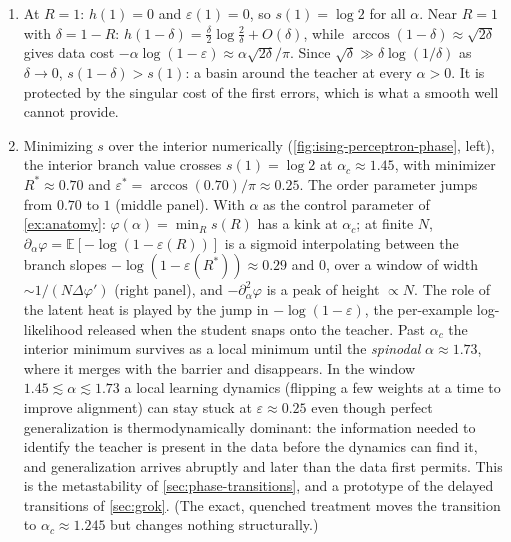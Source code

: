\documentclass[11pt]{article}
\newcommand{\E}{\mathbb{E}}
\newcommand{\pd}{\partial}
\begin{document}
\begin{solution}[ex:ising]
\begin{enumerate}
\begin{figure}[H]
      \caption{The annealed action $s(R)$ of the Ising perceptron, \eqref{perc-action}, for several loads. Interior local minima are marked with circles; the teacher state $R=1$, where $s(1) = \log2$ exactly, with squares. The two basins exchange dominance near $\alpha\approx1.45$.}
      \label{fig:ising-perceptron-action}
    \end{figure}
    \item At $R=1$: $h(1) = 0$ and $\varepsilon(1) = 0$, so $s(1) = \log2$ for all $\alpha$. Near $R=1$ with $\delta = 1-R$: $h(1-\delta) = \frac{\delta}{2}\log\frac{2}{\delta}+O(\delta)$, while $\arccos(1-\delta)\approx\sqrt{2\delta}$ gives data cost $-\alpha\log(1-\varepsilon)\approx\alpha\sqrt{2\delta}/\pi$. Since $\sqrt\delta\gg\delta\log(1/\delta)$ as $\delta\to0$, $s(1-\delta)>s(1)$: a basin around the teacher at every $\alpha>0$. It is protected by the singular cost of the first errors, which is what a smooth well cannot provide.
    \item Minimizing $s$ over the interior numerically (\cref{fig:ising-perceptron-phase}, left), the interior branch value crosses $s(1) = \log2$ at $\alpha_c\approx1.45$, with minimizer $R^*\approx0.70$ and $\varepsilon^* = \arccos(0.70)/\pi\approx0.25$. The order parameter jumps from $0.70$ to $1$ (middle panel). With $\alpha$ as the control parameter of \cref{ex:anatomy}: $\varphi(\alpha) = \min_Rs(R)$ has a kink at $\alpha_c$; at finite $N$, $\pd_\alpha\varphi = \E[-\log(1-\varepsilon(R))]$ is a sigmoid interpolating between the branch slopes $-\log(1-\varepsilon(R^*))\approx0.29$ and $0$, over a window of width $\sim1/(N\Delta\varphi')$ (right panel), and $-\pd_\alpha^2\varphi$ is a peak of height $\propto N$. The role of the latent heat is played by the jump in $-\log(1-\varepsilon)$, the per-example log-likelihood released when the student snaps onto the teacher. Past $\alpha_c$ the interior minimum survives as a local minimum until the \emph{spinodal} $\alpha\approx1.73$, where it merges with the barrier and disappears. In the window $1.45\lesssim\alpha\lesssim1.73$ a local learning dynamics (flipping a few weights at a time to improve alignment) can stay stuck at $\varepsilon\approx0.25$ even though perfect generalization is thermodynamically dominant: the information needed to identify the teacher is present in the data before the dynamics can find it, and generalization arrives abruptly and later than the data first permits. This is the metastability of \cref{sec:phase-transitions}, and a prototype of the delayed transitions of \cref{sec:grok}. (The exact, quenched treatment \cite{gyorgyi1990first,engel2001statistical} moves the transition to $\alpha_c\approx1.245$ but changes nothing structurally.)

\end{enumerate}
\end{solution}
\end{document}

